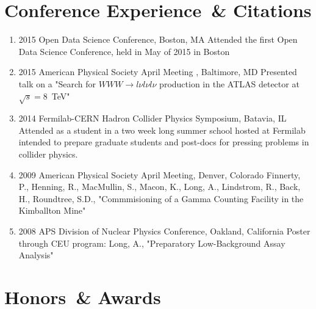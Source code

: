 \section*{Conference Experience~\& Citations}



\begin{enumerate}
 0cm \linewidth \listindent \dimexpr\linewidth-\listindent\relax

\item[] 2015 Open Data Science Conference, Boston, MA\newline
{Attended the first Open Data Science Conference, held in May of 2015 in Boston
}

\item[] 2015 American Physical Society April Meeting , Baltimore, MD\newline
{Presented talk on a "Search for $WWW\rightarrow l\nu l\nu l\nu$ production in the ATLAS detector at $\sqrt{s}=8$~TeV"
}

\item[] 2014 Fermilab-CERN Hadron Collider Physics Symposium, Batavia, IL\newline
{Attended as a student in a two week long summer school hosted at Fermilab intended to prepare graduate students and post-docs 
for pressing problems in collider physics.
}

\item[] 2009 American Physical Society April Meeting, Denver, Colorado \newline
{Finnerty, P., Henning, R., MacMullin, S., Macon, K., Long, A., Lindstrom, R.,
Back, H., Roundtree, S.D., "Commmisioning of a Gamma Counting Facility in the Kimballton
Mine"
} 

\item[] 2008 APS Division of Nuclear Physics Conference, Oakland, California \newline
{Poster through CEU program: Long, A., "Preparatory Low-Background Assay Analysis"
}
\end{enumerate}


\section*{Honors~\& Awards}


